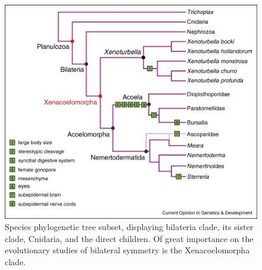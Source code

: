 \begin{figure}[H]
	\centering
	\includegraphics[width=0.9\linewidth]{bilateria_phylum}
	\caption[Bilateria clade \cite{Hejnol2016}]{Species phylogenetic tree subset, displaying bilateria clade, its sister clade, Cnidaria, and the direct children\cite{Hejnol2016}. Of great importance on the evolutionary studies of bilateral symmetry is the Xenacoelomorpha clade.}
	\label{fig:bilateriaphylum}
\end{figure}

